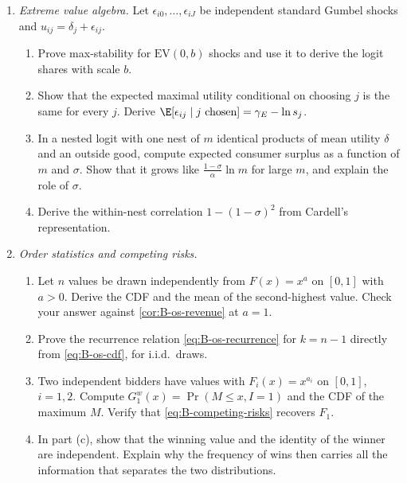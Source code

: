 \begin{enumerate}[label=\arabic*., leftmargin=*, itemsep=6pt]
\item \emph{Extreme value algebra.} Let $\epsilon_{i0}, \dots, \epsilon_{iJ}$ be independent standard Gumbel shocks and
$u_{ij} = \delta_j + \epsilon_{ij}$.
\begin{enumerate}[label=(\alph*)]
  \item Prove max-stability for $\mathrm{EV}(0, b)$ shocks and use it to derive the logit shares with scale $b$.
  \item Show that the expected maximal utility conditional on choosing $j$ is the same for every $j$. Derive
  $\E[\epsilon_{ij} \mid j \text{ chosen}] = \gamma_E - \ln s_j$.
  \item In a nested logit with one nest of $m$ identical products of mean utility $\delta$ and an outside good,
  compute expected consumer surplus as a function of $m$ and $\sigma$. Show that it grows like
  $\frac{1 - \sigma}{\alpha}\ln m$ for large $m$, and explain the role of $\sigma$.
  \item Derive the within-nest correlation $1 - (1 - \sigma)^2$ from Cardell's representation.
\end{enumerate}

\item \emph{Order statistics and competing risks.}
\begin{enumerate}[label=(\alph*)]
  \item Let $n$ values be drawn independently from $F(x) = x^a$ on $[0, 1]$ with $a > 0$. Derive the CDF and the mean
  of the second-highest value. Check your answer against \cref{cor:B-os-revenue} at $a = 1$.
  \item Prove the recurrence relation \eqref{eq:B-os-recurrence} for $k = n - 1$ directly from \eqref{eq:B-os-cdf},
  for i.i.d.\ draws.
  \item Two independent bidders have values with $F_i(x) = x^{a_i}$ on $[0, 1]$, $i = 1, 2$. Compute
  $G_1^w(x) = \Pr(M \leq x, I = 1)$ and the CDF of the maximum $M$. Verify that \eqref{eq:B-competing-risks}
  recovers $F_1$.
  \item In part (c), show that the winning value and the identity of the winner are independent. Explain why the
  frequency of wins then carries all the information that separates the two distributions.
\end{enumerate}


\end{enumerate}
